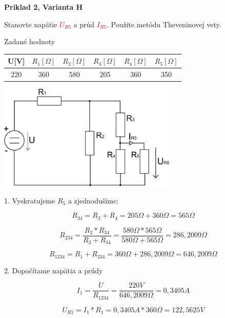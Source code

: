 \documentclass[a4paper,12pt]{article}
\begin{document}
\begin{center}
\textbf{Priklad 2, Varianta H}
\end{center}
\bigskip
Stanovte napätie 
\textcolor{red}{$U_{R5}$}
a prúd
\textcolor{red}{$I_{R5}$}.
Použite metódu Theveninovej vety.
\bigskip

Zadané hodnoty

\begin{tabular} {|  c | c |  c | c | c | c | }
\hline
U[V] & $R_1[\Omega]$ & $R_2[\Omega]$ & $R_3[\Omega]$ & $R_4[\Omega]$ & $R_5[\Omega]$\\ \hline
220 & 360 & 580 & 205 & 360 & 350 \\ \hline
\end{tabular}
\bigskip

\includegraphics[height=5cm]{img/pr2a}

1. Vyskratujeme $R_5$ a zjednodušíme:

\begin{equation*}
R_{34} = R_3 + R_4= 205\Omega + 360\Omega = 565\Omega
\end{equation*}

\begin{equation*}
R_{234} = \frac{R_2*R_{34}}{R_2+R_{34}} = \frac{580\Omega*565\Omega}{580\Omega + 565\Omega} = 286,2009\Omega
\end{equation*}

\begin{equation*}
R_{1234}= R_1 + R_{234} = 360\Omega + 286,2009\Omega =  646,2009\Omega
\end{equation*}

2. Dopočítame napätia a prúdy

\begin{equation*}
I_1 = \frac{U}{R_{1234}} = \frac{220V}{646,2009\Omega} = 0,3405A
\end{equation*}

\begin{equation*}
U_{R1} = I_1 * R_1 =  0,3405 A * 360\Omega = 122,5625V
\end{equation*}
\end{document}
